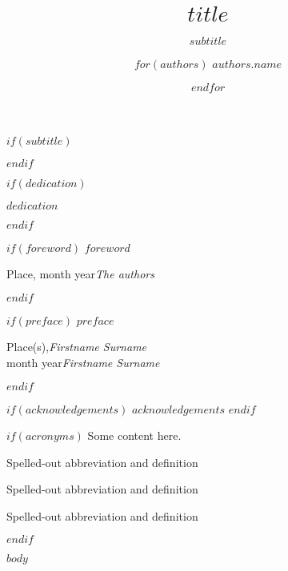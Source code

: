 \documentclass[graybox,envcountchap,sectrefs]{svmono}
\begin{document}
\author{ $for(authors)$ $authors.name$ \and $endfor$ }

\title{$title$}

$if(subtitle)$
    \subtitle{$subtitle$}
$endif$

\maketitle

\frontmatter%

$if(dedication)$
    \begin{dedication}
        $dedication$
    \end{dedication}
$endif$

$if(foreword)$
    \foreword
    $foreword$
    \vspace{\baselineskip}
    \begin{flushright}\noindent
    Place, month year\hfill {\it The authors}\\
    \end{flushright}
$endif$

$if(preface)$
    \preface
    $preface$
    \vspace{\baselineskip}
    \begin{flushright}\noindent
    Place(s),\hfill {\it Firstname  Surname}\\
    month year\hfill {\it Firstname  Surname}\\
    \end{flushright}
$endif$

$if(acknowledgements)$
    $acknowledgements$
$endif$

\tableofcontents

$if(acronyms)$
    Some content here.
    \begin{description}[CABR]
    \item[ABC]{Spelled-out abbreviation and definition}
    \item[BABI]{Spelled-out abbreviation and definition}
    \item[CABR]{Spelled-out abbreviation and definition}
    \end{description}
$endif$


\mainmatter%

$body$

\backmatter%

\printindex




\end{document}
